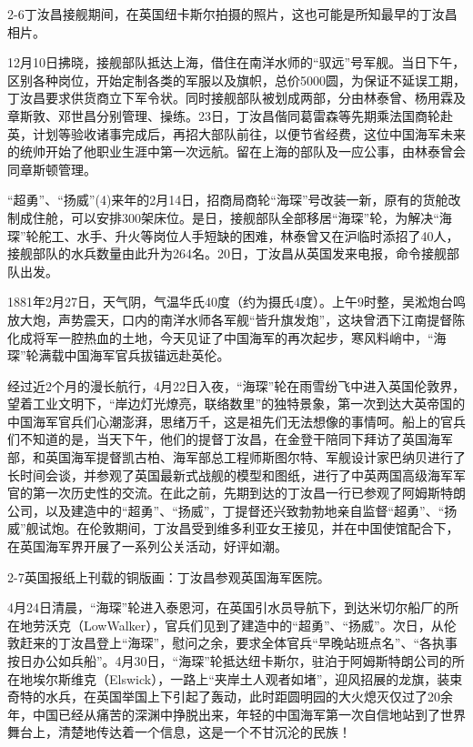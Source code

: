\documentclass[12pt,UTF8]{ctexbook}
\begin{document}
2-6丁汝昌接舰期间，在英国纽卡斯尔拍摄的照片，这也可能是所知最早的丁汝昌相片。

12月10日拂晓，接舰部队抵达上海，借住在南洋水师的“驭远”号军舰。当日下午，区别各种岗位，开始定制各类的军服以及旗帜，总价5000圆，为保证不延误工期，丁汝昌要求供货商立下军令状。同时接舰部队被划成两部，分由林泰曾、杨用霖及章斯敦、邓世昌分别管理、操练。23日，丁汝昌偕同葛雷森等先期乘法国商轮赴英，计划等验收诸事完成后，再招大部队前往，以便节省经费，这位中国海军未来的统帅开始了他职业生涯中第一次远航。留在上海的部队及一应公事，由林泰曾会同章斯顿管理。

“超勇”、“扬威”(4)来年的2月14日，招商局商轮“海琛”号改装一新，原有的货舱改制成住舱，可以安排300架床位。是日，接舰部队全部移居“海琛”轮，为解决“海琛”轮舵工、水手、升火等岗位人手短缺的困难，林泰曾又在沪临时添招了40人，接舰部队的水兵数量由此升为264名。20日，丁汝昌从英国发来电报，命令接舰部队出发。

1881年2月27日，天气阴，气温华氏40度（约为摄氏4度）。上午9时整，吴淞炮台鸣放大炮，声势震天，口内的南洋水师各军舰“皆升旗发炮”，这块曾洒下江南提督陈化成将军一腔热血的土地，今天见证了中国海军的再次起步，寒风料峭中，“海琛”轮满载中国海军官兵拔锚远赴英伦。

经过近2个月的漫长航行，4月22日入夜，“海琛”轮在雨雪纷飞中进入英国伦敦界，望着工业文明下，“岸边灯光燎亮，联络数里”的独特景象，第一次到达大英帝国的中国海军官兵们心潮澎湃，思绪万千，这是祖先们无法想像的事情呵。船上的官兵们不知道的是，当天下午，他们的提督丁汝昌，在金登干陪同下拜访了英国海军部，和英国海军提督凯古柏、海军部总工程师斯图尔特、军舰设计家巴纳贝进行了长时间会谈，并参观了英国最新式战舰的模型和图纸，进行了中英两国高级海军军官的第一次历史性的交流。在此之前，先期到达的丁汝昌一行已参观了阿姆斯特朗公司，以及建造中的“超勇”、“扬威”，丁提督还兴致勃勃地亲自监督“超勇”、“扬威”舰试炮。在伦敦期间，丁汝昌受到维多利亚女王接见，并在中国使馆配合下，在英国海军界开展了一系列公关活动，好评如潮。

2-7英国报纸上刊载的铜版画：丁汝昌参观英国海军医院。

4月24日清晨，“海琛”轮进入泰恩河，在英国引水员导航下，到达米切尔船厂的所在地劳沃克（LowWalker），官兵们见到了建造中的“超勇”、“扬威”。次日，从伦敦赶来的丁汝昌登上“海琛”，慰问之余，要求全体官兵“早晚站班点名”、“各执事按日办公如兵船”。4月30日，“海琛”轮抵达纽卡斯尔，驻泊于阿姆斯特朗公司的所在地埃尔斯维克（Elswick），一路上“夹岸土人观者如堵”，迎风招展的龙旗，装束奇特的水兵，在英国举国上下引起了轰动，此时距圆明园的大火熄灭仅过了20余年，中国已经从痛苦的深渊中挣脱出来，年轻的中国海军第一次自信地站到了世界舞台上，清楚地传达着一个信息，这是一个不甘沉沦的民族！
\end{document}
